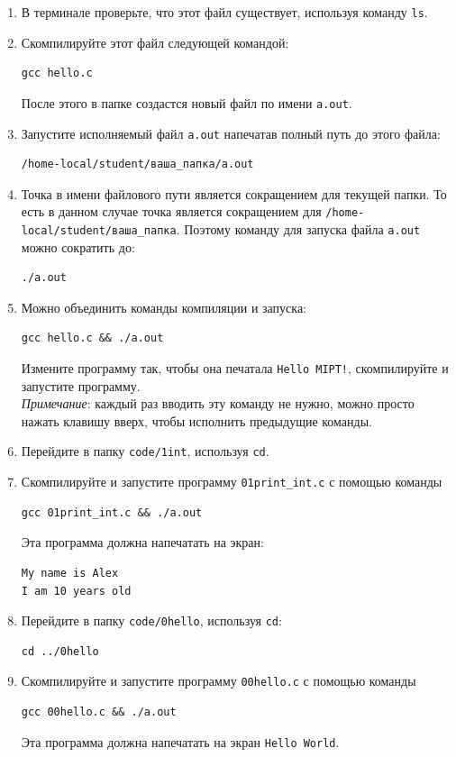\documentclass{article}
\begin{document}
\begin{enumerate}
\item В терминале проверьте, что этот файл существует, используя команду \texttt{ls}.
\item Скомпилируйте этот файл следующей командой:
\begin{verbatim}
gcc hello.c
\end{verbatim}
После этого в папке создастся новый файл по имени \texttt{a.out}.
\item Запустите исполняемый файл \texttt{a.out} напечатав полный путь до этого файла:
\begin{verbatim}
/home-local/student/ваша_папка/a.out
\end{verbatim}
\item Точка в имени файлового пути является сокращением для текущей папки. То есть в данном случае точка является сокращением для \texttt{/home-local/student/ваша\_папка}. Поэтому команду для запуска файла \texttt{a.out} можно сократить до:
\begin{verbatim}
./a.out
\end{verbatim}
\item Можно объединить команды компиляции и запуска:
\begin{verbatim}
gcc hello.c && ./a.out
\end{verbatim}
Измените программу так, чтобы она печатала \texttt{Hello MIPT!}, скомпилируйте и запустите программу. \\
\textit{Примечание}: каждый раз вводить эту команду не нужно, можно просто нажать клавишу вверх, чтобы исполнить предыдущие команды.


\item Перейдите в папку \texttt{code/1int}, используя \texttt{cd}.

\item Скомпилируйте и запустите программу \texttt{01print\_int.c} с помощью команды
\begin{verbatim}
gcc 01print_int.c && ./a.out
\end{verbatim}
Эта программа должна напечатать на экран:
\begin{verbatim}
My name is Alex
I am 10 years old
\end{verbatim}

\item Перейдите в папку \texttt{code/0hello}, используя \texttt{cd}:
\begin{verbatim}
cd ../0hello
\end{verbatim}

\item Скомпилируйте и запустите программу \texttt{00hello.c} с помощью команды
\begin{verbatim}
gcc 00hello.c && ./a.out
\end{verbatim}
Эта программа должна напечатать на экран \texttt{Hello World}.


\end{enumerate}
\end{document}
